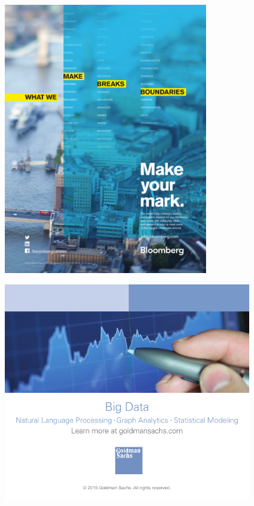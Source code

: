 \clearpage
\thispagestyle{empty}
\begin{center}
\includegraphics[width=3.5in]{content/ads/platinum/Bloomberg.pdf}
\end{center}

\clearpage
\thispagestyle{empty}
\includegraphics[width=4.25in]{content/ads/gold/goldman_sachs.pdf}


